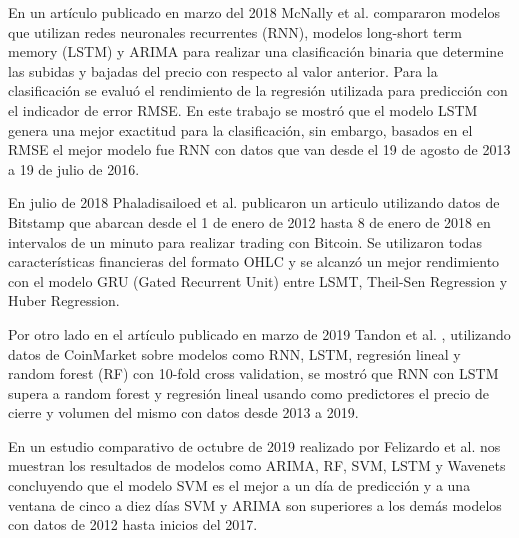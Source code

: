 En un artículo publicado en marzo del 2018 McNally et al. \cite{mcnallyPredictingPriceBitcoin2018} compararon modelos que utilizan redes neuronales recurrentes (RNN), modelos long-short term memory (LSTM) y ARIMA para realizar una clasificación binaria que determine las subidas y bajadas del precio con respecto al valor anterior. Para la clasificación se evaluó el rendimiento de la regresión utilizada para predicción con el indicador de error RMSE.
En este trabajo se mostró que el modelo LSTM genera una mejor exactitud para la clasificación, sin embargo, basados en el RMSE el mejor modelo fue RNN con datos que van desde el 19 de agosto de 2013 a 19 de julio de 2016. 


En julio de 2018 Phaladisailoed et al. \cite{phaladisailoedMachineLearningModels2018} publicaron un articulo utilizando datos de Bitstamp que abarcan desde el 1 de enero de 2012 hasta 8 de enero de 2018 en intervalos de un minuto para realizar trading con Bitcoin. Se utilizaron todas características financieras del formato OHLC y se alcanzó un mejor rendimiento con el modelo GRU (Gated Recurrent Unit) entre LSMT, Theil-Sen Regression y Huber Regression. 


Por otro lado en el artículo publicado en marzo de 2019 Tandon et al. \cite{tandonBitcoinPriceForecasting2019}, utilizando datos de CoinMarket sobre modelos como RNN, LSTM, regresión lineal y random forest (RF) con 10-fold cross validation, se mostró que RNN con LSTM supera a random forest y regresión lineal usando como predictores el precio de cierre y volumen del mismo con datos desde 2013 a 2019.


En un estudio comparativo de octubre de 2019 realizado por Felizardo et al. \cite{felizardoComparativeStudyBitcoin2019} nos muestran los resultados de modelos como ARIMA, RF, SVM, LSTM y Wavenets concluyendo que el modelo SVM es el mejor a un día de predicción y a una ventana de cinco a diez días SVM y ARIMA son superiores a los demás modelos con datos de 2012 hasta inicios del 2017.



